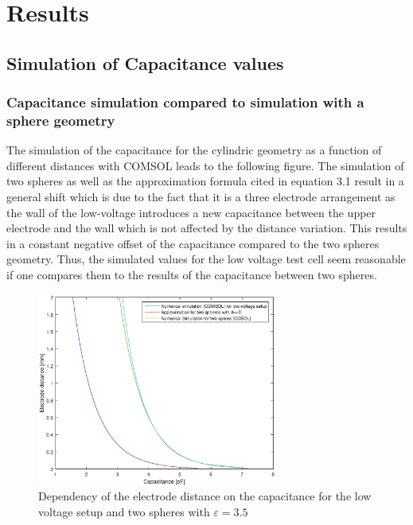 
\chapter{Results}
\label{chp.results}
\section{Simulation of Capacitance values}
\subsection{Capacitance simulation compared to simulation with a sphere geometry}
The simulation of the capacitance for the cylindric geometry as a function of different distances with COMSOL leads to the following figure. The simulation of two spheres as well as the approximation formula cited in equation 3.1 result in a general 
shift which is due to the fact that it is a three electrode arrangement as the wall of the
low-voltage introduces a new capacitance between the upper electrode and the wall which is not affected by the distance variation. This results in a constant negative offset of the capacitance compared to the 
two spheres geometry. Thus, the simulated values for the low voltage test cell seem reasonable if one compares them to the results of the capacitance between two spheres. \newline 

\begin{figure}[H]
	\centering
	\includegraphics[width=0.7\textwidth]{figures/Method/Part1_d_C0/Comparison_Low_voltage_Two_spheres.eps}		
	\caption[Kurze Abbildungsbeschreibung]{Dependency of the electrode distance on the capacitance for the low voltage setup and two spheres with $\varepsilon = 3.5$ } 
	\label{fig.waveforms}
\end{figure}


